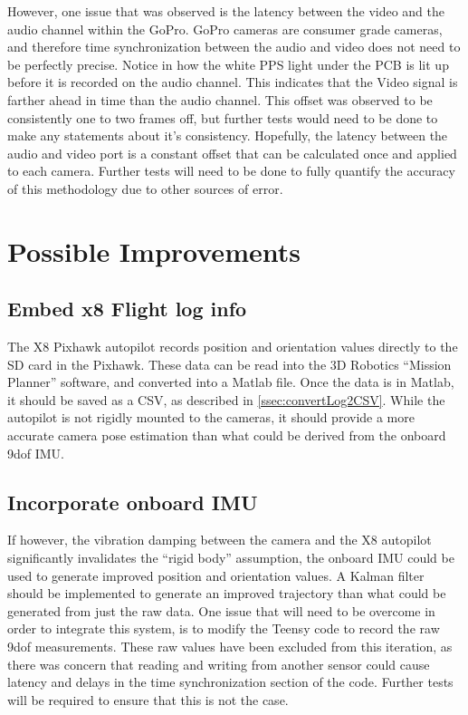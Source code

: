 	However, one issue that was observed is the latency between the video and the audio channel within the GoPro.  GoPro cameras are consumer grade cameras, and therefore time synchronization between the audio and video does not need to be perfectly precise.  Notice in  how the white PPS light under the PCB is lit up before it is recorded on the audio channel.  This indicates that the Video signal is farther ahead in time than the audio channel.  This offset was observed to be consistently one to two frames off, but further tests would need to be done to make any statements about it's consistency.  Hopefully, the latency between the audio and video port is a constant offset that can be calculated once and applied to each camera.  Further tests will need to be done to fully quantify the accuracy of this methodology due to other sources of error.	
	
	\section{Possible Improvements}
	\subsection{Embed x8 Flight log info}
	The X8 Pixhawk autopilot records position and orientation values directly to the SD card in the Pixhawk.  These data can be read into the 3D Robotics ``Mission Planner'' software, and converted into a Matlab file.  Once the data is in Matlab, it should be saved as a CSV, as described in \ref{ssec:convertLog2CSV}.  While the autopilot is not rigidly mounted to the cameras, it should provide a more accurate camera pose estimation than what could be derived from the onboard 9dof IMU.
	\subsection{Incorporate onboard IMU}
	If however, the vibration damping between the camera and the X8 autopilot significantly invalidates the ``rigid body'' assumption, the onboard IMU could be used to generate improved position and orientation values.  A Kalman filter should be implemented to generate an improved trajectory than what could be generated from just the raw data.  One issue that will need to be overcome in order to integrate this system, is to modify the Teensy code to record the raw 9dof measurements.  These raw values have been excluded from this iteration, as there was concern that reading and writing from another sensor could cause latency and delays in the time synchronization section of the code.  Further tests will be required to ensure that this is not the case.